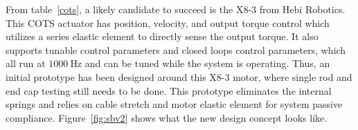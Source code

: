 \begin{table}[tbhp]
\centering
\caption{List of companies that sell COTS actuators to be integrated into \SB{} v2. This is not an exhaustive list.}
\label{cots}
\end{table}

From table~\ref{cots}, a likely candidate to succeed is the X8-3 from Hebi Robotics.
This COTS actuator has position, velocity, and output torque control which utilizes a series elastic element to directly sense the output torque.
It also supports tunable control parameters and closed loops control parameters, which all run at \(\SI{1000}{\hertz}\) and can be tuned while the system is operating.
Thus, an initial prototype has been designed around this X8-3 motor, where single rod and end cap testing still needs to be done.
This prototype eliminates the internal springs and relies on cable stretch and motor elastic element for system passive compliance.
Figure~\ref{fig:sbv2} shows what the new design concept looks like.

